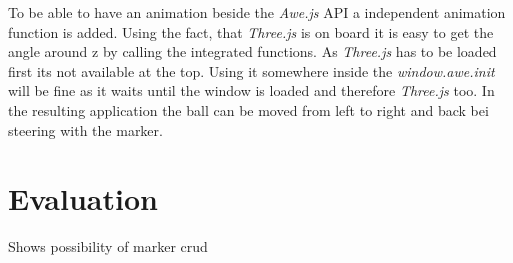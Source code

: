 To be able to have an animation beside the \textit{Awe.js} API a independent animation function is added. 
Using the fact, that \textit{Three.js} is on board it is easy to get the angle around z by calling the integrated functions. As \textit{Three.js} has to be loaded first its not available at the top. Using it somewhere inside the \textit{window.awe.init} will be fine as it waits until the window is loaded and therefore \textit{Three.js} too. In the resulting application the ball can be moved from left to right and back bei steering with the marker.

\section{Evaluation}

Shows possibility of marker
crud


